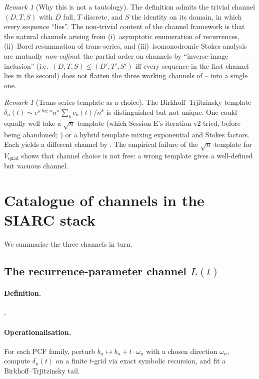 \documentclass[11pt,reqno]{amsart}
\theoremstyle{plain}
\theoremstyle{definition}
\theoremstyle{remark}
\newtheorem{remark}[theorem]{Remark}
\newcommand{\Lt}{L(t)}
\newcommand{\Vquad}{V_{\mathrm{quad}}}
\newcommand{\dn}{\delta_{n}}
\begin{document}
\begin{remark}[Why this is not a tautology]
\label{rem:not-tautology}
The definition admits the trivial channel $(D,T,S)$ with $D$
full, $T$ discrete, and $S$ the identity on its domain, in
which every sequence ``lies''. The non-trivial content of
the channel framework is that the natural channels arising
from (i)~asymptotic enumeration of recurrences, (ii)~Borel
resummation of trans-series, and (iii)~isomonodromic Stokes
analysis are mutually \emph{non-cofinal}: the partial order
on channels by ``inverse-image inclusion'' (i.e.\
$(D,T,S) \le (D',T',S')$ iff every sequence in the first
channel lies in the second) does not flatten the three
working channels of -- into a
single one.
\end{remark}

\begin{remark}[Trans-series template as a choice]
\label{rem:template}
The Birkhoff--Trjitzinsky template
$\dn(t) \sim e^{\rho \log n} n^{\sigma} \sum_k c_k(t)/n^k$
is distinguished but not unique. One could equally well
take a $\sqrt n$-template (which Session E's iteration v2
tried, before being abandoned;
\cite{siarc_borel_5x}) or a hybrid template
mixing exponential and Stokes factors. Each yields a
different channel by . The empirical
failure of the $\sqrt n$-template for $\Vquad$ shows that
channel choice is not free: a wrong template gives a
well-defined but vacuous channel.
\end{remark}

\section{Catalogue of channels in the SIARC stack}
\label{sec:catalogue}

We summarise the three channels in turn.

\subsection{The recurrence-parameter channel $\Lt$}
\label{ssec:lt}

\paragraph{Definition.} .

\paragraph{Operationalisation.} For each PCF family, perturb
$b_n \mapsto b_n + t \cdot \omega_n$ with a chosen direction
$\omega_n$, compute $\dn(t)$ on a finite $t$-grid via exact
symbolic recursion, and fit a Birkhoff--Trjitzinsky tail.
\end{document}
